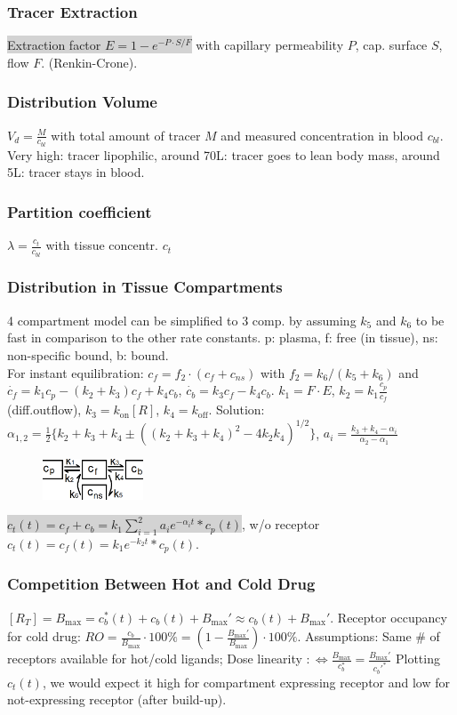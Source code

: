 \documentclass[9pt]{article}
\newcommand{\grey}[1]{\setlength{\fboxsep}{0pt}\colorbox{lightgrey}{#1}}
\begin{document}
\begin{multicols}{2}
\subsubsection{Tracer Extraction}
\grey{Extraction factor $E = 1-e^{-P\cdot S / F}$} with capillary permeability $P$, cap. surface $S$, flow $F$. (Renkin-Crone).

\subsubsection{Distribution Volume} $V_d = \frac{M}{c_{bl}}$ with total amount of tracer $M$ and measured concentration in blood $c_{bl}$. Very high: tracer lipophilic, around 70L: tracer goes to lean body mass, around 5L: tracer stays in blood.

\subsubsection{Partition coefficient} $\lambda = \frac{c_t}{c_{bl}}$ with tissue concentr. $c_t$

\subsubsection{Distribution in Tissue Compartments}
4 compartment model can be simplified to 3 comp. by assuming $k_5$ and $k_6$ to be fast in comparison to the other rate constants. 
p: plasma, f: free (in tissue), ns: non-specific bound, b: bound.\\ For instant equilibration: $c_f= f_2 \cdot (c_f + c_{ns})$ with $f_2=k_6/(k_5+k_6)$ and $\dot{c_f} = k_1c_p - (k_2+k_3)c_f + k_4c_b$, $\dot{c_b} = k_3c_f - k_4c_b$. $k_1 = F\cdot E$, $k_2 = k_1 \frac{c_p}{c_f}$ (diff.outflow), $k_3=k_\mathrm{on}[R]$, $k_4=k_\mathrm{off}$. Solution: $\alpha_{1,2}=\frac{1}{2}\{k_2+k_3+k_4\pm((k_2+k_3+k_4)^2-4k_2k_4)^{1/2}\}$, $a_i=\frac{k_3+k_4-\alpha_i}{\alpha_2-\alpha_1}$
\begin{figure}
	\vspace{-3mm}
	\includegraphics[width=3cm,]{tissuecompartments.png}
\end{figure}
\grey{$c_t(t)=c_f + c_b =k_1\sum_{i=1}^2 a_ie^{-\alpha_it} \ast c_p(t)$}, w/o receptor $c_t(t)=c_f(t)=k_1e^{-k_2t}\ast c_p(t)$. 

\subsubsection{Competition Between Hot and Cold Drug} $[R_T] = B_\mathrm{max}=c_b^*(t)+c_b(t)+B_\mathrm{max}'\approx c_b(t)+B_\mathrm{max}'$. Receptor occupancy for cold drug: $RO = \frac{c_b}{B_\mathrm{max}} \cdot 100\% = (1-\frac{B_\mathrm{max}'}{B_\mathrm{max}}) \cdot 100\%$. Assumptions: Same \# of receptors available for hot/cold ligands; Dose linearity $:\Leftrightarrow \frac{B_\mathrm{max}}{c_b^*} = \frac{B_\mathrm{max}'}{c_b'^*}$ Plotting $c_t(t)$, we would expect it high for compartment expressing receptor and low for not-expressing receptor (after build-up).


\end{multicols}
\end{document}
